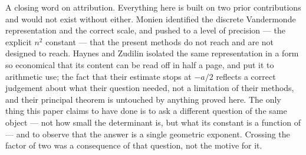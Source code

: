 \documentclass[11pt]{amsart}
\numberwithin{equation}{section}
\theoremstyle{plain}
\theoremstyle{definition}
\theoremstyle{remark}
\begin{document}
A closing word on attribution. Everything here is built on two prior contributions and would not
exist without either. Monien \cite{Monien2009} identified the discrete Vandermonde representation
and the correct scale, and pushed to a level of precision --- the explicit $n^{2}$ constant --- that
the present methods do not reach and are not designed to reach. Haynes and Zudilin
\cite{HaynesZudilin2015} isolated the same representation in a form so economical that its content
can be read off in half a page, and put it to arithmetic use; the fact that their estimate stops at
$-a/2$ reflects a correct judgement about what their question needed, not a limitation of their
methods, and their principal theorem is untouched by anything proved here. The only thing this paper
claims to have done is to ask a different question of the same object --- not how small the
determinant is, but what its constant is a function of --- and to observe that the answer is a
single geometric exponent. Crossing the factor of two was a consequence of that question, not the
motive for it.
\end{document}
